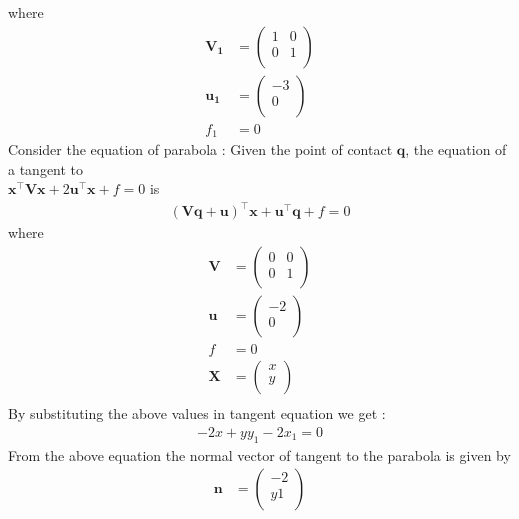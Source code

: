 \documentclass[journal,10pt,twocolumn]{article}
\let\vec\mathbf
\providecommand{\brak}[1]{\ensuremath{\left(#1\right)}}
\begin{document}
where
\begin{align}
\vec{V_1}&=\begin{pmatrix}
	1 & 0\\
	0 & 1\\
	\end{pmatrix} \\
    \vec{u_1}&=\begin{pmatrix}
	-3 \\
	0 \\
	\end{pmatrix} \\
	f_1&=0
    \end{align}
Consider the equation of parabola :
Given the point of contact $\vec{q}$, the equation of a tangent to  \\ $\vec{x}^{\top}\vec{V}\vec{x}+2\vec{u}^{\top}\vec{x}+f=0$ is 
  \begin{align}
  \brak{\vec{V}\vec{q}+\vec{u}}^{\top}\vec{x}+\vec{u}^{\top}\vec{q}+f = 0
  \label{eq:conic_tangent_final}
  \end{align}
where 
\begin{align}
\vec{V}&=\begin{pmatrix}
	0 & 0\\
	0 & 1\\
	\end{pmatrix} \\
    \vec{u}&=\begin{pmatrix}
	-2 \\
	0 \\
	\end{pmatrix} \\
	f&=0 \\
	\vec{X}&=\begin{pmatrix}
	x \\
	y \\
	\end{pmatrix} \\
\end{align}
By substituting the above values in tangent equation we get :
\begin{align}
-2x+yy_1-2x_1=0
\end{align}
From the above equation the normal vector of tangent to the parabola is given by 
\begin{align}
\vec{n}&=\begin{pmatrix}
	-2 \\
	y1 \\
	\end{pmatrix}
\end{align}
\end{document}

